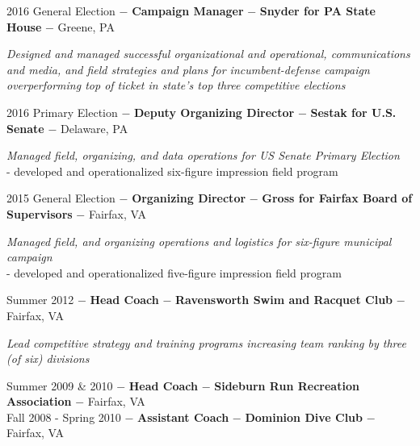 \documentclass[8pt]{article}
\begin{document}
2016 General Election  $-$ \textbf{Campaign Manager} $-$ \textbf{Snyder for PA State House} $-$ Greene, PA
\begin{adjustwidth}{1cm}{1cm}
	\textit{Designed and managed successful organizational and operational, communications and media, and field strategies and plans for incumbent-defense campaign overperforming top of ticket in state's top three competitive elections}\\
\end{adjustwidth}

2016 Primary Election $-$ \textbf{Deputy Organizing Director} $-$ \textbf{Sestak for U.S. Senate} $-$ Delaware, PA
\begin{adjustwidth}{1cm}{1cm}
	\textit{Managed field, organizing, and data operations for US Senate Primary Election}\\
- developed and operationalized six-figure impression field program\\
\end{adjustwidth}

2015 General Election  $-$ \textbf{Organizing Director} $-$ \textbf{Gross for Fairfax Board of Supervisors} $-$ Fairfax, VA
\begin{adjustwidth}{1cm}{1cm}
	\textit{Managed field, and organizing operations and logistics for six-figure municipal campaign}\\
- developed and operationalized five-figure impression field program\\
\end{adjustwidth}

Summer 2012  $-$ \textbf{Head Coach} $-$ \textbf{Ravensworth Swim and Racquet Club} $-$ Fairfax, VA
\begin{adjustwidth}{1cm}{1cm}
	\textit{Lead competitive strategy and training programs increasing team ranking by three (of six) divisions}\\
\end{adjustwidth}

Summer 2009 \& 2010  $-$ \textbf{Head Coach} $-$ \textbf{Sideburn Run Recreation Association} $-$ Fairfax, VA \\

Fall 2008 - Spring 2010 $-$ \textbf{Assistant Coach} $-$  \textbf{Dominion Dive Club} $-$ Fairfax, VA \\[2.5pt]

\thispagestyle{empty}
\newpage
\end{document}
